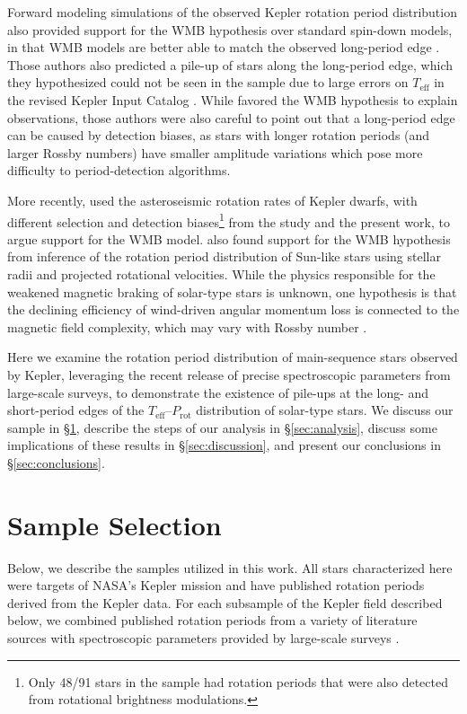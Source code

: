 \documentclass[trackchanges,twocolumn]{aastex631}
\newcommand{\teff}{\ensuremath{T_{\mathrm{eff}}}\xspace}
\newcommand{\prot}{\ensuremath{P_\mathrm{rot}}\xspace}
\begin{document}
Forward modeling simulations of the observed Kepler rotation period distribution also provided support for the WMB hypothesis over standard spin-down models, in that WMB models are better able to match the observed long-period edge \citep{vanSaders2019}. Those authors also predicted a pile-up of stars along the long-period edge, which they hypothesized could not be seen in the \citet{McQuillan2014} sample due to large errors on \teff in the revised Kepler Input Catalog \citep[KIC,][]{Huber2014}. While \citet{vanSaders2019} favored the WMB hypothesis to explain observations, those authors were also careful to point out that a long-period edge can be caused by detection biases, as stars with longer rotation periods (and larger Rossby numbers) have smaller amplitude variations which pose more difficulty to period-detection algorithms. 

More recently, \citet{Hall2021} used the asteroseismic rotation rates of Kepler dwarfs, with different selection and detection biases\footnote{Only 48/91 stars in the \citet{Hall2021} sample had rotation periods that were also detected from rotational brightness modulations.} from the \citet{vanSaders2019} study and the present work, to argue support for the WMB model. \citet{Masuda2021} also found support for the WMB hypothesis from inference of the rotation period distribution of Sun-like stars using stellar radii and projected rotational velocities.  While the physics responsible for the weakened magnetic braking of solar-type stars is unknown, one hypothesis is that the declining efficiency of wind-driven angular momentum loss is connected to the magnetic field complexity, which may vary with Rossby number \citep[e.g.][]{Reville2015, vanSaders2016, Garraffo2016, Metcalfe2016, Metcalfe2019}.  

Here we examine the rotation period distribution of main-sequence stars observed by Kepler, leveraging the recent release of precise spectroscopic parameters from large-scale surveys, to demonstrate the existence of pile-ups at the long- and short-period edges of the \teff--\prot distribution of solar-type stars. We discuss our sample in \S\ref{sec:sample}, describe the steps of our analysis in \S\ref{sec:analysis}, discuss some implications of these results in \S\ref{sec:discussion}, and present our conclusions in \S\ref{sec:conclusions}.

\section{Sample Selection} \label{sec:sample}
Below, we describe the samples utilized in this work. All stars characterized here were targets of NASA's Kepler mission \citep{Borucki2010} and have published rotation periods derived from the Kepler data. For each subsample of the Kepler field described below, we combined published rotation periods from a variety of literature sources with spectroscopic parameters provided by large-scale surveys .
\end{document}
